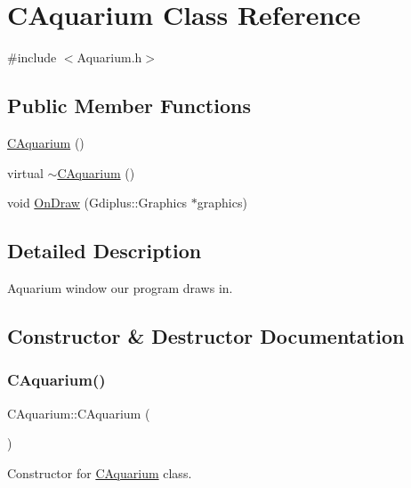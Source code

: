 \hypertarget{class_c_aquarium}{}\section{C\+Aquarium Class Reference}
\label{class_c_aquarium}


{\ttfamily \#include $<$Aquarium.\+h$>$}

\subsection*{Public Member Functions}
\begin{DoxyCompactItemize}
\item 
\mbox{\hyperlink{class_c_aquarium_ab6ba8b1abd87437ff66748e82173a5a8}{C\+Aquarium}} ()
\item 
virtual \mbox{\hyperlink{class_c_aquarium_ab1baf78dc047af2b8cab8982e1446875}{$\sim$\+C\+Aquarium}} ()
\item 
void \mbox{\hyperlink{class_c_aquarium_a20b4899158d1ba4bc41217630d47e180}{On\+Draw}} (Gdiplus\+::\+Graphics $\ast$graphics)
\end{DoxyCompactItemize}


\subsection{Detailed Description}
Aquarium window our program draws in. 

\subsection{Constructor \& Destructor Documentation}
\mbox{\label{class_c_aquarium_ab6ba8b1abd87437ff66748e82173a5a8}} 
\subsubsection{\texorpdfstring{C\+Aquarium()}{CAquarium()}}
{\footnotesize\ttfamily C\+Aquarium\+::\+C\+Aquarium (\begin{DoxyParamCaption}{ }\end{DoxyParamCaption})}

Constructor for \mbox{\hyperlink{class_c_aquarium}{C\+Aquarium}} class. \mbox{\label{class_c_aquarium_ab1baf78dc047af2b8cab8982e1446875}} 
